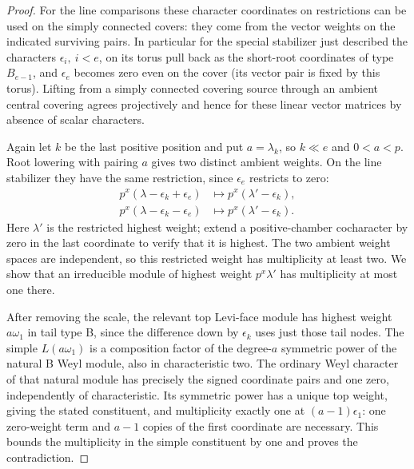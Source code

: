 \begin{proof}
For the line comparisons these character coordinates on restrictions can be used on the simply connected covers: they come from the vector weights on the indicated surviving pairs. In particular for the special stabilizer just described the characters \(\epsilon_i,\ i<e\), on its torus pull back as the short-root coordinates of type \(B_{e-1}\), and \(\epsilon_e\) becomes zero even on the cover (its vector pair is fixed by this torus). Lifting from a simply connected covering source through an ambient central covering agrees projectively and hence for these linear vector matrices by absence of scalar characters.

Again let \(k\) be the last positive position and put
\(a=\lambda_k\), so \(k\ll e\) and \(0<a<p\).  Root lowering
with pairing \(a\) gives two distinct ambient weights.  On the
line stabilizer they have the same restriction, since
\(\epsilon_e\) restricts to zero:
\[
 \begin{aligned}
 p^x(\lambda-\epsilon_k+\epsilon_e)
   &\longmapsto p^x(\lambda'-\epsilon_k),\\
 p^x(\lambda-\epsilon_k-\epsilon_e)
   &\longmapsto p^x(\lambda'-\epsilon_k).
 \end{aligned}
\]
Here \(\lambda'\) is the restricted highest weight; extend a
positive-chamber cocharacter by zero in the last coordinate to
verify that it is highest.  The two ambient weight spaces are
independent, so this restricted weight has multiplicity at least
two.  We show that an irreducible module of highest weight
\(p^x\lambda'\) has multiplicity at most one there.

After removing the scale, the relevant top Levi-face module has
highest weight \(a\omega_1\) in tail type B, since the difference
down by \(\epsilon_k\) uses just those tail nodes.  The simple
\(L(a\omega_1)\) is a composition factor of the degree-\(a\)
symmetric power of the natural B Weyl module, also in characteristic
two.  The ordinary Weyl character of that natural module has precisely
the signed coordinate pairs and one zero, independently of
characteristic.  Its symmetric power has a unique top weight, giving
the stated constituent, and multiplicity exactly one at
\((a-1)\epsilon_1\): one zero-weight term and \(a-1\) copies of the
first coordinate are necessary.  This bounds the multiplicity in
the simple constituent by one and proves the contradiction.

\end{proof}

